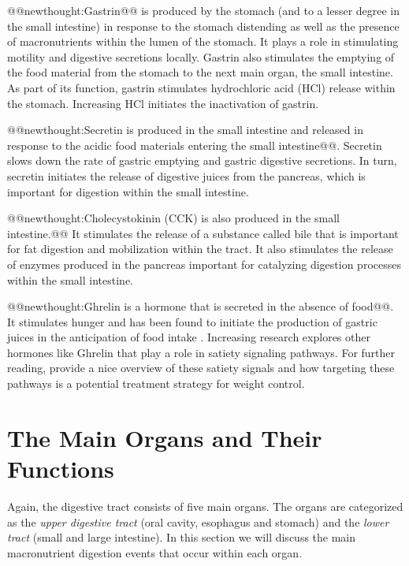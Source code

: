 \documentclass{tufte-handout}
\makeatletter
\def\newthought#1{@@newthought:#1@@}
\makeatother
\begin{document}
\newthought{Gastrin} is produced by the stomach (and to a lesser degree in the small intestine) in response to the stomach distending as well as the presence of macronutrients within the lumen of the stomach. It plays a role in stimulating motility and digestive secretions locally. Gastrin also stimulates the emptying of the food material from the stomach to the next main organ, the small intestine. As part of its function, gastrin stimulates hydrochloric acid (HCl) release within the stomach. Increasing HCl initiates the inactivation of gastrin. 

\newthought{Secretin is produced in the small intestine and released in response to the acidic food materials entering the small intestine}. Secretin slows down the rate of gastric emptying and gastric digestive secretions. In turn, secretin initiates the release of digestive juices from the pancreas, which is important for digestion within the small intestine. 

\newthought{Cholecystokinin (CCK) is also produced in the small intestine.} It stimulates the release of a substance called bile that is important for fat digestion and mobilization within the tract. It also stimulates the release of enzymes produced in the pancreas important for catalyzing digestion processes within the small intestine.

\newthought{Ghrelin is a hormone that is secreted in the absence of food}. It stimulates hunger and has been found to initiate the production of gastric juices in the anticipation of food intake \citep{Inui2004}. Increasing research explores other hormones like Ghrelin that play a role in satiety signaling pathways. For further reading, \citet{Schwartz2000} provide a nice overview of these satiety signals and how targeting these pathways is a potential treatment strategy for weight control.

\section{The Main Organs and Their Functions}
Again, the digestive tract consists of five main organs. The organs are categorized as the  \emph{upper digestive tract} (oral cavity, esophagus and stomach) and the \emph{lower tract} (small and large intestine). In this section we will discuss the main macronutrient digestion events that occur within each
organ.
\end{document}
